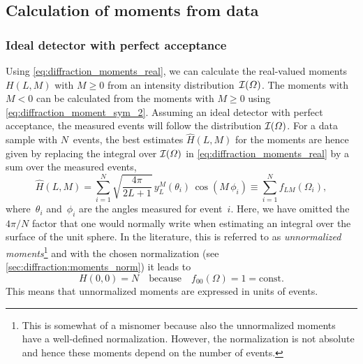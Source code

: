 \subsection{Calculation of moments from data}%
\label{sec:diffraction:moments_data}

\subsubsection{Ideal detector with perfect acceptance}%
\label{sec:diffraction:moments_data_no_acc}

Using \cref{eq:diffraction_moments_real}, we can calculate the
real-valued moments $H(L, M)$ with $M \geq 0$ from an intensity
distribution~$\mathcal{I}(\Omega)$.  The moments with $M < 0$ can be
calculated from the moments with $M \geq 0$ using
\cref{eq:diffraction_moment_sym_2}.  Assuming an ideal detector with
perfect acceptance, the measured events will follow the distribution
$\mathcal{I}(\Omega)$.  For a data sample with $N$~events, the best
estimates $\hat{H}(L, M)$ for the moments are hence given by replacing
the integral over $\mathcal{I}(\Omega)$ in
\cref{eq:diffraction_moments_real} by a sum over the measured events,
\ie
\begin{equation}
  \label{eq:diffraction_moments_estimate}
  \hat{H}(L, M)
  = \sum_{i = 1}^N \sqrt{\frac{4 \pi}{2 L + 1}}\, y_L^M(\theta_i)\, \cos(M\, \phi_i)
  \equiv \sum_{i = 1}^N f_{L M}(\Omega_i),
\end{equation}
where~$\theta_i$ and~$\phi_i$ are the angles measured for event~$i$.
Here, we have omitted the $4 \pi / N$ factor that one would normally
write when estimating an integral over the surface of the unit sphere.
In the literature, this is referred to as \emph{unnormalized
moments}\footnote{This is somewhat of a misnomer because also the
unnormalized moments have a well-defined normalization.  However, the
normalization is not absolute and hence these moments depend on the
number of events.} and with the chosen normalization (see
\cref{sec:diffraction:moments_norm}) it leads to
\begin{equation}
  \label{eq:diffraction_norm_00}
  H(0, 0)
  = N
  \quad\text{because}\quad
  f_{00}(\Omega)
  = 1
  = \text{const}.
\end{equation}
This
means that unnormalized moments are expressed in units of events.

